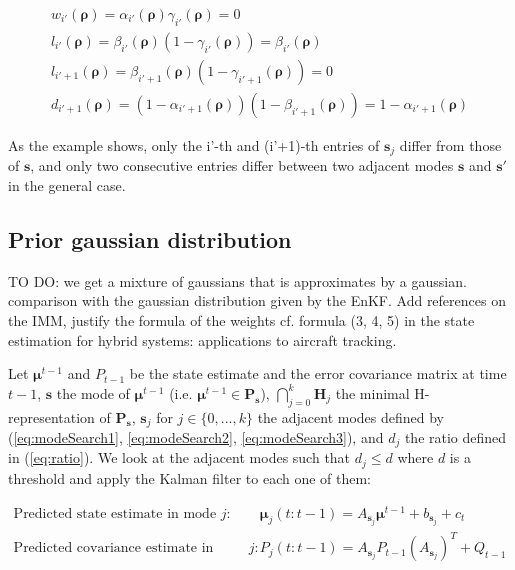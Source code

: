 \begin{equation}
\begin{array}{l}
w_{i'}(\boldsymbol\rho)=\alpha_{i'}(\boldsymbol\rho)\gamma_{i'}(\boldsymbol\rho)=0\\
l_{i'}(\boldsymbol\rho)=\beta_{i'}(\boldsymbol\rho)(1-\gamma_{i'}(\boldsymbol\rho))=\beta_{i'}(\boldsymbol\rho)\\
l_{i'+1}(\boldsymbol\rho)=\beta_{i'+1}(\boldsymbol\rho)(1-\gamma_{i'+1}(\boldsymbol\rho))=0\\
d_{i'+1}(\boldsymbol\rho)=(1-\alpha_{i'+1}(\boldsymbol\rho))(1-\beta_{i'+1}(\boldsymbol\rho))=1-\alpha_{i'+1}(\boldsymbol\rho)
\end{array}
\label{eq:modeSearch8}
\end{equation}

As the example shows, only the i'-th and (i'+1)-th entries of $\boldsymbol s_{j}$ differ from those of $\boldsymbol s$, and only two consecutive entries differ between two adjacent modes $\boldsymbol s$ and $\boldsymbol s'$ in the general case.


\subsection{Prior gaussian distribution}

TO DO: we get a mixture of gaussians that is approximates by a gaussian. comparison with the gaussian distribution given by the EnKF. Add references on the IMM, justify the formula of the weights cf. formula (3, 4, 5) in the state estimation for hybrid systems: applications to aircraft tracking.

Let $\boldsymbol\mu^{t-1}$ and $P_{t-1}$ be the state estimate and the error covariance matrix at time $t-1$, $\boldsymbol s$ the mode of $\boldsymbol\mu^{t-1}$ (i.e. $\boldsymbol\mu^{t-1}\in \textbf{P}_{\boldsymbol s}$), $\bigcap_{j=0}^{k} \textbf{H}_{j}$ the minimal H-representation of $\textbf{P}_{\boldsymbol s}$, $\boldsymbol s_{j}$ for $j\in\{0,...,k\}$ the adjacent modes defined by (\ref{eq:modeSearch1}, \ref{eq:modeSearch2}, \ref{eq:modeSearch3}), and $d_{j}$ the ratio defined in (\ref{eq:ratio}). We look at the adjacent modes such that $d_{j}\leq d$ where $d$ is a threshold and apply the Kalman filter to each one of them:

\begin{equation}
\begin{array}{ll}
\text{Predicted state estimate in mode $j$: } & \boldsymbol\mu_{j}(t:t-1) = A_{\boldsymbol s_{j}} \boldsymbol\mu^{t-1} + b_{\boldsymbol s_{j}} + c_{t}\\
\text{Predicted covariance estimate in mode $j$: } & P_{j}(t:t-1) = A_{\boldsymbol s_{j}}P_{t-1}(A_{\boldsymbol s_{j}})^{T} + Q_{t-1}
\end{array}
\label{eq:mixture1}
\end{equation}

